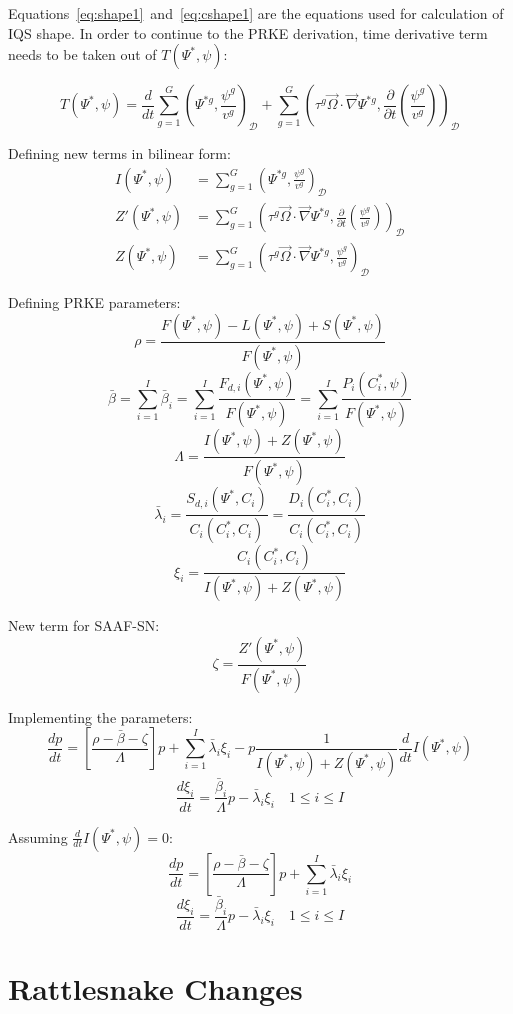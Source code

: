 \documentclass[11pt]{tamurmemo}
\newcommand{\grad}{\vec{\nabla}}
\newcommand{\be}{\begin{equation}}
\newcommand{\ee}{\end{equation}}
\newcommand{\vo}{\vec{\Omega}}
\newcommand{\D}{\ensuremath{\mathcal{D}}}
\begin{document}
Equations~\ref{eq:shape1}~and~\ref{eq:cshape1} are the equations used for calculation of IQS shape.  In order to continue to the PRKE derivation, time derivative term needs to be taken out of $T(\Psi^{*},\psi)$:

\be
T(\Psi^{*},\psi) = \frac{d}{dt}\sum_{g=1}^G\left(\Psi^{*g},\frac{\psi^g}{v^g}\right)_\D + \sum_{g=1}^G\left(\tau^g\vo\cdot\grad\Psi^{*g},\frac{\partial}{\partial t}\left(\frac{\psi^g}{v^g}\right)\right)_\D
\ee

Defining new terms in bilinear form:
\begin{align}
I(\Psi^{*},\psi) &= \sum_{g=1}^G\left(\Psi^{*g},\frac{\psi^g}{v^g}\right)_\D \\
Z'(\Psi^{*},\psi) &= \sum_{g=1}^G\left(\tau^g\vo\cdot\grad\Psi^{*g},\frac{\partial}{\partial t}\left(\frac{\psi^g}{v^g}\right)\right)_\D \\
Z(\Psi^{*},\psi) &= \sum_{g=1}^G\left(\tau^g\vo\cdot\grad\Psi^{*g},\frac{\psi^g}{v^g}\right)_\D
\end{align}

Defining PRKE parameters:
\be
\rho = \frac{F(\Psi^{*},\psi) - L(\Psi^{*},\psi) + S(\Psi^{*},\psi)}{F(\Psi^{*},\psi)}
\ee
\be
\bar{\beta} = \sum_{i=1}^I\bar{\beta}_i = \sum_{i=1}^I\frac{F_{d,i}(\Psi^*,\psi)}{F(\Psi^{*},\psi)} = \sum_{i=1}^I\frac{P_i(C_i^*,\psi)}{F(\Psi^{*},\psi)}
\ee
\be
\Lambda = \frac{I(\Psi^{*},\psi)+Z(\Psi^{*},\psi)}{F(\Psi^{*},\psi)}
\ee
\be
\bar{\lambda}_i = \frac{S_{d,i}(\Psi^*,C_i)}{C_i(C_i^*,C_i)} = \frac{D_i(C_i^*,C_i)}{C_i(C_i^*,C_i)}
\ee
\be
\xi_i = \frac{C_i(C_i^*,C_i)}{I(\Psi^{*},\psi)+Z(\Psi^{*},\psi)}
\ee

New term for SAAF-SN:
\be 
\zeta = \frac{Z'(\Psi^*,\psi)}{F(\Psi^{*},\psi)}
\ee

Implementing the parameters:
\be
\frac{dp}{dt}=\left[\frac{\rho-\bar{\beta}-\zeta}{\Lambda}\right]p + \sum_{i=1}^I\bar{\lambda}_i\xi_i - p\frac{1}{I(\Psi^{*},\psi)+Z(\Psi^{*},\psi)}\frac{d}{dt} I(\Psi^{*},\psi)
\ee
\be
\frac{d\xi_i}{dt}=\frac{\bar{\beta}_i}{\Lambda}p - \bar{\lambda}_i\xi_i \quad 1 \le i \le I 
\ee

Assuming $\frac{d}{dt} I(\Psi^{*},\psi) = 0$:
\be
\frac{dp}{dt}=\left[\frac{\rho-\bar{\beta}-\zeta}{\Lambda}\right]p+\sum_{i=1}^I\bar{\lambda}_i\xi_i
\label{eq:p}
\ee
\be
\frac{d\xi_i}{dt}=\frac{\bar{\beta}_i}{\Lambda}p - \bar{\lambda}_i\xi_i\quad 1 \le i \le I 
\label{eq:xi}
\ee

\section{Rattlesnake Changes}
\end{document}
